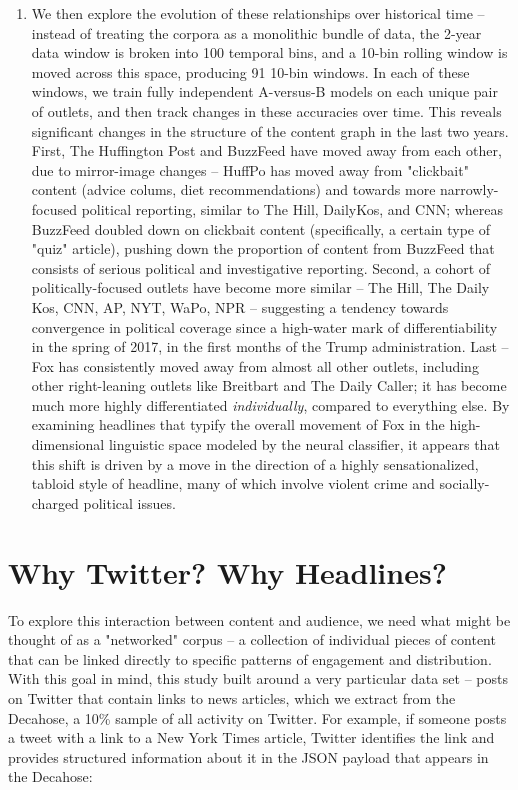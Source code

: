 \documentclass{scrartcl}
\begin{document}
\begin{enumerate}
\item We then explore the evolution of these relationships over historical time -- instead of treating the corpora as a monolithic bundle of data, the 2-year data window is broken into 100 temporal bins, and a 10-bin rolling window is moved across this space, producing 91 10-bin windows. In each of these windows, we train fully independent A-versus-B models on each unique pair of outlets, and then track changes in these accuracies over time. This reveals significant changes in the structure of the content graph in the last two years. First, The Huffington Post and BuzzFeed have moved away from each other, due to mirror-image changes -- HuffPo has moved away from "clickbait" content (advice colums, diet recommendations) and towards more narrowly-focused political reporting, similar to The Hill, DailyKos, and CNN; whereas BuzzFeed doubled down on clickbait content (specifically, a certain type of "quiz" article), pushing down the proportion of content from BuzzFeed that consists of serious political and investigative reporting. Second, a cohort of politically-focused outlets have become more similar -- The Hill, The Daily Kos, CNN, AP, NYT, WaPo, NPR -- suggesting a tendency towards convergence in political coverage since a high-water mark of differentiability in the spring of 2017, in the first months of the Trump administration. Last -- Fox has consistently moved away from almost all other outlets, including other right-leaning outlets like Breitbart and The Daily Caller; it has become much more highly differentiated \textit{individually}, compared to everything else. By examining headlines that typify the overall movement of Fox in the high-dimensional linguistic space modeled by the neural classifier, it appears that this shift is driven by a move in the direction of a highly sensationalized, tabloid style of headline, many of which involve violent crime and socially-charged political issues.

\end{enumerate}

\section{Why Twitter? Why Headlines?}

To explore this interaction between content and audience, we need what might be thought of as a "networked" corpus -- a collection of individual pieces of content that can be linked directly to specific patterns of engagement and distribution. With this goal in mind, this study built around a very particular data set -- posts on Twitter that contain links to news articles, which we extract from the Decahose, a 10\% sample of all activity on Twitter. For example, if someone posts a tweet with a link to a New York Times article, Twitter identifies the link and provides structured information about it in the JSON payload that appears in the Decahose:
\end{document}
